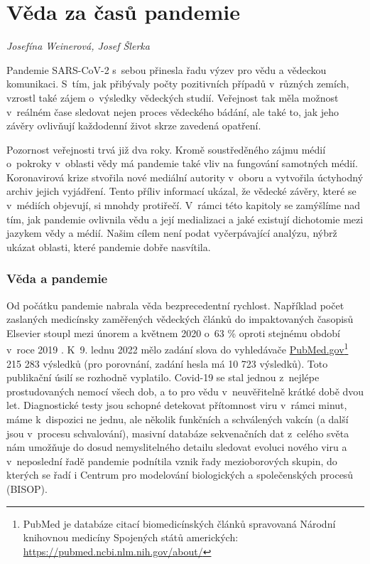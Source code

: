 \chapter{V\v{e}da za \v{c}as\r{u} pandemie}
\label{Veda_pandemie}

\textit{Josefína Weinerová, Josef Šlerka}

\vspace{15mm}


\noindent Pandemie SARS-CoV-2 s~sebou přinesla řadu výzev pro vědu a vědeckou komunikaci. S~tím, jak přibývaly počty pozitivních případů v~různých zemích, vzrostl také zájem o~výsledky vědeckých studií. Veřejnost tak měla možnost v~reálném čase sledovat nejen proces vědeckého bádání, ale také to, jak jeho závěry ovlivňují každodenní život skrze zavedená opatření.

Pozornost veřejnosti trvá již dva roky. Kromě soustředěného zájmu médií o~pokroky v~oblasti vědy má pandemie také vliv na fungování samotných médií. Koronavirová krize stvořila nové mediální autority v~oboru a vytvořila úctyhodný archiv jejich vyjádření. Tento příliv informací ukázal, že vědecké závěry, které se v~médiích objevují, si mnohdy protiřečí. V~rámci této kapitoly se zamýšlíme nad tím, jak pandemie ovlivnila vědu a její medializaci a jaké existují dichotomie mezi jazykem vědy a médií. Našim cílem není podat vyčerpávající analýzu, nýbrž ukázat oblasti, které pandemie dobře nasvítila.

\subsection*{Věda a pandemie}

Od počátku pandemie nabrala věda bezprecedentní rychlost. Například počet zaslaných medicínsky zaměřených vědeckých článků do impaktovaných časopisů Elsevier stoupl mezi únorem a květnem 2020 o~63 \% oproti stejnému období v~roce 2019 \cite{Squazzoni2021}. K~9. lednu 2022 mělo zadání slova  do vyhledávače \url{PubMed.gov}\footnote{PubMed je databáze citací biomedicínských článků spravovaná Národní knihovnou medicíny Spojených států amerických: \url{https://pubmed.ncbi.nlm.nih.gov/about/}} 215 283 výsledků (pro porovnání, zadání hesla  má  10 723 výsledků).
Toto publikační úsilí se rozhodně vyplatilo. Covid-19 se stal jednou z~nejlépe prostudovaných nemocí všech dob, a to pro vědu v~neuvěřitelně krátké době dvou let. Diagnostické testy jsou schopné detekovat přítomnost viru v~rámci minut, máme k~dispozici ne jednu, ale několik funkčních a schválených vakcín (a další jsou v~procesu schvalování), masivní databáze sekvenačních dat z~celého světa nám umožňuje do dosud nemyslitelného detailu sledovat evoluci nového viru \cite{Maxmen2021} a v~neposlední řadě pandemie podnítila vznik řady mezioborových skupin, do kterých se řadí i Centrum pro modelování biologických a společenských procesů (BISOP).

